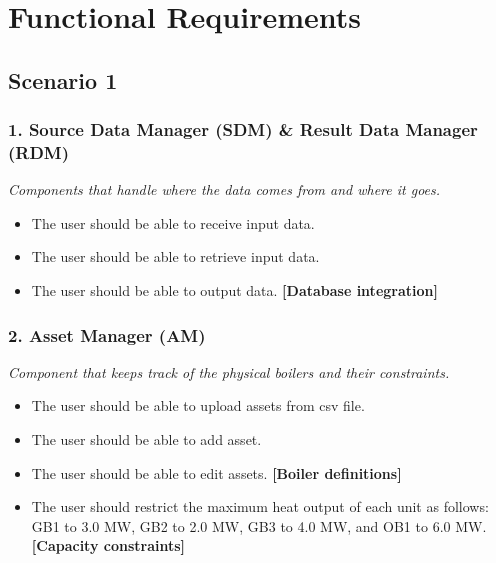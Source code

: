 \section{Functional Requirements}

\subsection*{Scenario 1}

\subsubsection*{1. Source Data Manager (SDM) \& Result Data Manager (RDM)}
\textit{Components that handle where the data comes from and where it goes.}

\begin{itemize}
    \item The user should be able to receive input data.
    \item The user should be able to retrieve input data.
    \item The user should be able to output data. \textbf{[Database integration]}
\end{itemize}

\subsubsection*{2. Asset Manager (AM)}
\textit{Component that keeps track of the physical boilers and their constraints.}

\begin{itemize}
    \item The user should be able to upload assets from csv file.
    \item The user should be able to add asset.
    \item The user should be able to edit assets. \textbf{[Boiler definitions]}
    \item The user should restrict the maximum heat output of each unit as follows: GB1 to 3.0 MW, GB2 to 2.0 MW, GB3 to 4.0 MW, and OB1 to 6.0 MW. \textbf{[Capacity constraints]}
\end{itemize}

